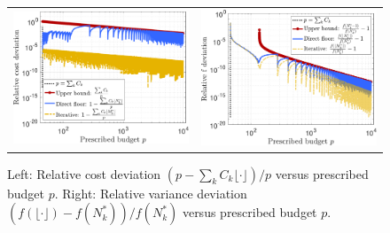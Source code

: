 %
\begin{figure}[!t]\centering
\begin{tabular}{cc}
\includegraphics[width=0.48\linewidth]{./Figures/Eg2_Cost.pdf} &
\includegraphics[width=0.48\linewidth]{./Figures/Eg2_f.pdf}
\end{tabular}
\caption{
Left: Relative cost deviation $(p - \sum_k C_k \lfloor \cdot \rfloor)/p$ versus prescribed budget $p$. Right: Relative variance deviation $(f(\lfloor \cdot \rfloor) - f(N_k^*))/f(N_k^*)$ versus prescribed budget $p$.
} 
\label{fig:Eg2} 
\end{figure}
%




















